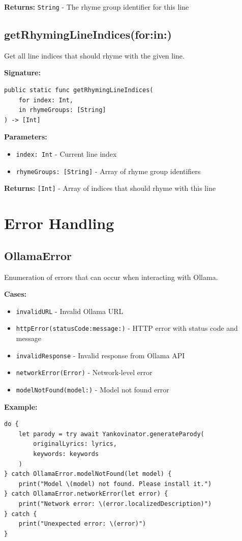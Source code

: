 \documentclass[11pt,a4paper]{article}
\begin{document}
\textbf{Returns:} \texttt{String} - The rhyme group identifier for this line

\subsection{getRhymingLineIndices(for:in:)}

Get all line indices that should rhyme with the given line.

\textbf{Signature:}
\begin{lstlisting}
public static func getRhymingLineIndices(
    for index: Int,
    in rhymeGroups: [String]
) -> [Int]
\end{lstlisting}

\textbf{Parameters:}
\begin{itemize}
    \item \texttt{index: Int} - Current line index
    \item \texttt{rhymeGroups: [String]} - Array of rhyme group identifiers
\end{itemize}

\textbf{Returns:} \texttt{[Int]} - Array of indices that should rhyme with this line

\section{Error Handling}

\subsection{OllamaError}

Enumeration of errors that can occur when interacting with Ollama.

\textbf{Cases:}
\begin{itemize}
    \item \texttt{invalidURL} - Invalid Ollama URL
    \item \texttt{httpError(statusCode:message:)} - HTTP error with status code and message
    \item \texttt{invalidResponse} - Invalid response from Ollama API
    \item \texttt{networkError(Error)} - Network-level error
    \item \texttt{modelNotFound(model:)} - Model not found error
\end{itemize}

\textbf{Example:}
\begin{lstlisting}
do {
    let parody = try await Yankovinator.generateParody(
        originalLyrics: lyrics,
        keywords: keywords
    )
} catch OllamaError.modelNotFound(let model) {
    print("Model \(model) not found. Please install it.")
} catch OllamaError.networkError(let error) {
    print("Network error: \(error.localizedDescription)")
} catch {
    print("Unexpected error: \(error)")
}
\end{lstlisting}
\end{document}

